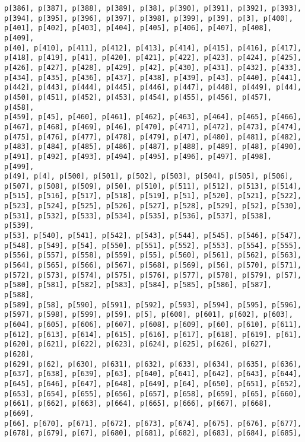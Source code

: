 \documentclass[
  letterpaper,
  DIV=11,
  numbers=noendperiod]{scrartcl}
\begin{document}
\begin{verbatim}
p[386], p[387], p[388], p[389], p[38], p[390], p[391], p[392], p[393],
p[394], p[395], p[396], p[397], p[398], p[399], p[39], p[3], p[400],
p[401], p[402], p[403], p[404], p[405], p[406], p[407], p[408], p[409],
p[40], p[410], p[411], p[412], p[413], p[414], p[415], p[416], p[417],
p[418], p[419], p[41], p[420], p[421], p[422], p[423], p[424], p[425],
p[426], p[427], p[428], p[429], p[42], p[430], p[431], p[432], p[433],
p[434], p[435], p[436], p[437], p[438], p[439], p[43], p[440], p[441],
p[442], p[443], p[444], p[445], p[446], p[447], p[448], p[449], p[44],
p[450], p[451], p[452], p[453], p[454], p[455], p[456], p[457], p[458],
p[459], p[45], p[460], p[461], p[462], p[463], p[464], p[465], p[466],
p[467], p[468], p[469], p[46], p[470], p[471], p[472], p[473], p[474],
p[475], p[476], p[477], p[478], p[479], p[47], p[480], p[481], p[482],
p[483], p[484], p[485], p[486], p[487], p[488], p[489], p[48], p[490],
p[491], p[492], p[493], p[494], p[495], p[496], p[497], p[498], p[499],
p[49], p[4], p[500], p[501], p[502], p[503], p[504], p[505], p[506],
p[507], p[508], p[509], p[50], p[510], p[511], p[512], p[513], p[514],
p[515], p[516], p[517], p[518], p[519], p[51], p[520], p[521], p[522],
p[523], p[524], p[525], p[526], p[527], p[528], p[529], p[52], p[530],
p[531], p[532], p[533], p[534], p[535], p[536], p[537], p[538], p[539],
p[53], p[540], p[541], p[542], p[543], p[544], p[545], p[546], p[547],
p[548], p[549], p[54], p[550], p[551], p[552], p[553], p[554], p[555],
p[556], p[557], p[558], p[559], p[55], p[560], p[561], p[562], p[563],
p[564], p[565], p[566], p[567], p[568], p[569], p[56], p[570], p[571],
p[572], p[573], p[574], p[575], p[576], p[577], p[578], p[579], p[57],
p[580], p[581], p[582], p[583], p[584], p[585], p[586], p[587], p[588],
p[589], p[58], p[590], p[591], p[592], p[593], p[594], p[595], p[596],
p[597], p[598], p[599], p[59], p[5], p[600], p[601], p[602], p[603],
p[604], p[605], p[606], p[607], p[608], p[609], p[60], p[610], p[611],
p[612], p[613], p[614], p[615], p[616], p[617], p[618], p[619], p[61],
p[620], p[621], p[622], p[623], p[624], p[625], p[626], p[627], p[628],
p[629], p[62], p[630], p[631], p[632], p[633], p[634], p[635], p[636],
p[637], p[638], p[639], p[63], p[640], p[641], p[642], p[643], p[644],
p[645], p[646], p[647], p[648], p[649], p[64], p[650], p[651], p[652],
p[653], p[654], p[655], p[656], p[657], p[658], p[659], p[65], p[660],
p[661], p[662], p[663], p[664], p[665], p[666], p[667], p[668], p[669],
p[66], p[670], p[671], p[672], p[673], p[674], p[675], p[676], p[677],
p[678], p[679], p[67], p[680], p[681], p[682], p[683], p[684], p[685],

\end{verbatim}
\end{document}

